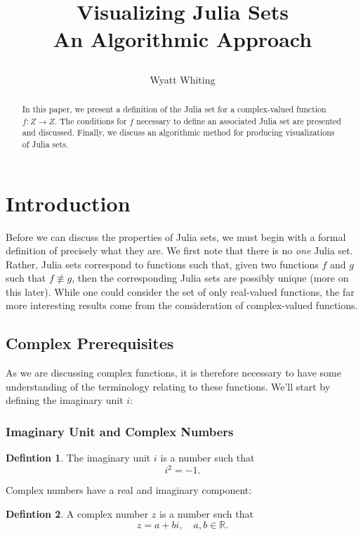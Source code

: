 \documentclass[12pt]{article}
\title{%
	Visualizing Julia Sets \\
	\large An Algorithmic Approach
	
	}
\author{Wyatt Whiting}
\def\RR{{\mathbb R}}
\begin{document}
\maketitle

\begin{abstract}
In this paper, we present a definition of the Julia set for a  complex-valued function $f:Z\rightarrow Z$. The conditions for $f$ necessary to define an associated Julia set are presented and discussed. Finally, we discuss an algorithmic method for producing visualizations of Julia sets.
\end{abstract}

\section{Introduction}

Before we can discuss the properties of Julia sets, we must begin with a formal definition of precisely what they are. We first note that there is no \textit{one} Julia set. Rather, Julia sets correspond to functions such that, given two functions $f$ and $g$ such that $f \not\equiv g$, then the corresponding Julia sets are possibly unique (more on this later). While one could consider the set of only real-valued functions, the far more interesting results come from the consideration of complex-valued functions.

\subsection{Complex Prerequisites}

As we are discussing complex functions, it is therefore necessary to have some understanding of the terminology relating to these functions. We'll start by defining the imaginary unit $i$:

\subsubsection{Imaginary Unit and Complex Numbers}

\theoremstyle{definition}%
\newtheorem{defin}{Defintion}
\begin{defin} The imaginary unit $i$ is a number such that
\[
i^2 = -1.
\]
\end{defin}

Complex numbers have a real and imaginary component:

\begin{defin} A complex number $z$ is a number such that
\[
z=a+bi, \quad a,b\in\RR.
\]
\end{defin}
\end{document}
